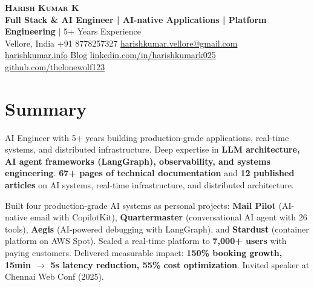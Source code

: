 \documentclass[letterpaper,11pt]{article}
\begin{document}
\begin{center}
    \textbf{\Huge \scshape \color{PrimaryBlue} Harish Kumar K} \\ \vspace{4pt}
    \small \textbf{Full Stack \& AI Engineer | AI-native Applications | Platform Engineering} $|$ 5+ Years Experience \\ \vspace{6pt}
    \small \color{DarkGray}
    \faMapMarker* Vellore, India \quad
    \faPhone* +91 8778257327 \quad
    \faEnvelope \hspace{1pt} \href{mailto:harishkumar.vellore@gmail.com}{harishkumar.vellore@gmail.com} \\ \vspace{3pt}
    \faGlobe \hspace{4px} \href{https://harishkumar.info}{harishkumar.info} \quad
    \faRss \hspace{4px} \href{https://harishkumar.info/blog}{Blog} \quad
    \faLinkedin \hspace{4px} \href{https://linkedin.com/in/harishkumark025}{linkedin.com/in/harishkumark025} \quad
    \faGithub \hspace{4px} \href{https://github.com/thelonewolf123}{github.com/thelonewolf123}
\end{center}
\vspace{4pt}

\section{Summary}
\small{\color{DarkGray}AI Engineer with 5+ years building production-grade applications, real-time systems, and distributed infrastructure. Deep expertise in \textbf{\color{black}LLM architecture, AI agent frameworks (LangGraph), observability, and systems engineering}. \textbf{\color{black}67+ pages of technical documentation} and \textbf{\color{black}12 published articles} on AI systems, real-time infrastructure, and distributed architecture.

Built four production-grade AI systems as personal projects: \textbf{\color{black}Mail Pilot} (AI-native email with CopilotKit), \textbf{\color{black}Quartermaster} (conversational AI agent with 26 tools), \textbf{\color{black}Aegis} (AI-powered debugging with LangGraph), and \textbf{\color{black}Stardust} (container platform on AWS Spot). Scaled a real-time platform to \textbf{\color{black}7,000+ users} with paying customers. Delivered measurable impact: \textbf{\color{black}150\% booking growth, 15min $\rightarrow$ 5s latency reduction, 55\% cost optimization}. Invited speaker at Chennai Web Conf (2025).}
\end{document}
